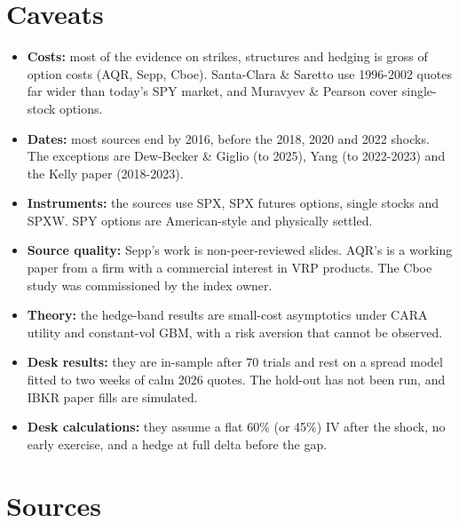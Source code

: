 \documentclass{article}
\begin{document}
\section{Caveats}

\begin{itemize}

\item \textbf{Costs:} most of the evidence on strikes, structures and hedging is gross of option costs (AQR, Sepp, Cboe). Santa-Clara \& Saretto use 1996-2002 quotes far wider than today's SPY market, and Muravyev \& Pearson cover single-stock options.

\item \textbf{Dates:} most sources end by 2016, before the 2018, 2020 and 2022 shocks. The exceptions are Dew-Becker \& Giglio (to 2025), Yang (to 2022-2023) and the Kelly paper (2018-2023).

\item \textbf{Instruments:} the sources use SPX, SPX futures options, single stocks and SPXW. SPY options are American-style and physically settled.

\item \textbf{Source quality:} Sepp's work is non-peer-reviewed slides. AQR's is a working paper from a firm with a commercial interest in VRP products. The Cboe study was commissioned by the index owner.

\item \textbf{Theory:} the hedge-band results are small-cost asymptotics under CARA utility and constant-vol GBM, with a risk aversion that cannot be observed.

\item \textbf{Desk results:} they are in-sample after 70 trials and rest on a spread model fitted to two weeks of calm 2026 quotes. The hold-out has not been run, and IBKR paper fills are simulated.

\item \textbf{Desk calculations:} they assume a flat 60\% (or 45\%) IV after the shock, no early exercise, and a hedge at full delta before the gap.

\end{itemize}

\section{Sources}
\end{document}
